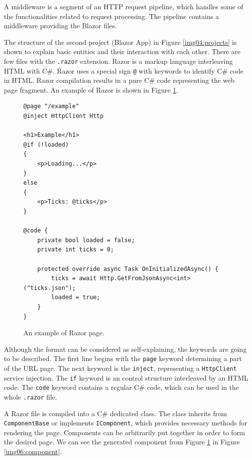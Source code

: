 A middleware is a segment of an HTTP request pipeline, which handles some of the functionalities related to request processing.
The pipeline contains a middleware providing the Blazor files.
\par
The structure of the second project (Blazor App) in Figure \ref{img04:projects} is shown to explain basic entities and their interaction with each other.
There are few files with the \texttt{.razor} extension.
Razor is a markup language interleaving HTML with C\#.
Razor uses a special sign \texttt{@} with keywords to identify C\# code in HTML.
Razor compilation results in a pure C\# code representing the web page fragment.
An example of Razor is shown in Figure \ref{img05:razor}.
\par
\begin{figure}
\begin{lstlisting}
@page "/example"
@inject HttpClient Http

<h1>Example</h1>
@if (!loaded)
{
    <p>Loading...</p>
}
else
{
    <p>Ticks: @ticks</p>
}

@code {
    private bool loaded = false;
    private int ticks = 0;

    protected override async Task OnInitializedAsync() {
        ticks = await Http.GetFromJsonAsync<int>("ticks.json");
        loaded = true;
    }
}
\end{lstlisting}
\caption{An example of Razor page.}
\label{img05:razor}
\end{figure}
\par
Although the format can be considered as self-explaining, the keywords are going to be described.
The first line begins with the \texttt{page} keyword determining a part of the URL page.
The next keyword is the \texttt{inject}, representing a \texttt{HttpClient} service injection. 
The \texttt{if} keyword is an control structure interleaved by an HTML code.
The \texttt{code} keyword contains a regular C\# code, which can be used in the whole \texttt{.razor} file.
\par
A Razor file is compiled into a C\# dedicated class.
The class inherits from \texttt{ComponentBase} or implements \texttt{IComponent}, which provides necessary methods for rendering the page.
Components can be arbitrarily put together in order to form the desired page.
We can see the generated component from Figure \ref{img05:razor} in Figure \ref{img06:component}.
\par
